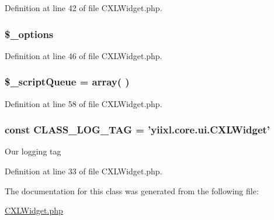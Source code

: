 Definition at line 42 of file CXLWidget.php.

\hypertarget{classCXLWidget_a1bebdc689c84eee59ad24c77e5531762}{
\subsubsection[{\$\_\-options}]{\setlength{\rightskip}{0pt plus 5cm}\$\_\-options}}
\label{classCXLWidget_a1bebdc689c84eee59ad24c77e5531762}


Definition at line 46 of file CXLWidget.php.

\hypertarget{classCXLWidget_a91cbf6ff0a073181fb836b51b0b781ac}{
\subsubsection[{\$\_\-scriptQueue}]{\setlength{\rightskip}{0pt plus 5cm}\$\_\-scriptQueue = array( )}}
\label{classCXLWidget_a91cbf6ff0a073181fb836b51b0b781ac}


Definition at line 58 of file CXLWidget.php.

\hypertarget{classCXLWidget_aa607ab5e557e6ebb60b85c5a20ad067f}{
\subsubsection[{CLASS\_\-LOG\_\-TAG}]{\setlength{\rightskip}{0pt plus 5cm}const {\bf CLASS\_\-LOG\_\-TAG} = 'yiixl.core.ui.CXLWidget'}}
\label{classCXLWidget_aa607ab5e557e6ebb60b85c5a20ad067f}
Our logging tag 

Definition at line 33 of file CXLWidget.php.



The documentation for this class was generated from the following file:\begin{DoxyCompactItemize}
\item 
\hyperlink{CXLWidget_8php}{CXLWidget.php}\end{DoxyCompactItemize}

